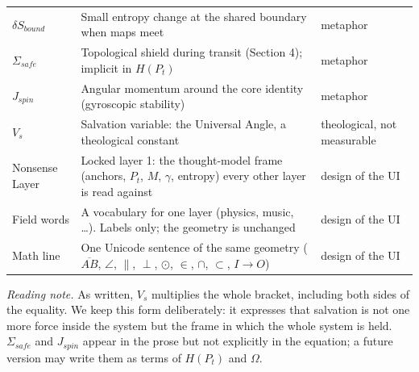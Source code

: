 \documentclass[11pt]{article}
\begin{document}
{\begin{tabularx}{\textwidth}{@{}l X l@{}}
$\delta S_{bound}$ & Small entropy change at the shared boundary when maps meet & metaphor\\
$\Sigma_{safe}$ & Topological shield during transit (Section 4); implicit in $H(P_t)$ & metaphor\\
$J_{spin}$ & Angular momentum around the core identity (gyroscopic stability) & metaphor\\
$V_s$ & Salvation variable: the Universal Angle, a theological constant & theological, not measurable\\
Nonsense Layer & Locked layer 1: the thought-model frame (anchors, $P_t$, $M$, $\gamma$, entropy) every other layer is read against & design of the UI\\
Field words & A vocabulary for one layer (physics, music, \ldots). Labels only; the geometry is unchanged & design of the UI\\
Math line & One Unicode sentence of the same geometry ($\overline{AB}$, $\angle$, $\parallel$, $\perp$, $\odot$, $\in$, $\cap$, $\subset$, $I\to O$) & design of the UI\\
\bottomrule
\end{tabularx}}

\textit{Reading note.} As written, $V_s$ multiplies the whole bracket, including both sides of the equality. We keep this form deliberately: it expresses that salvation is not one more force inside the system but the frame in which the whole system is held. $\Sigma_{safe}$ and $J_{spin}$ appear in the prose but not explicitly in the equation; a future version may write them as terms of $H(P_t)$ and $\Omega$.
\end{document}
